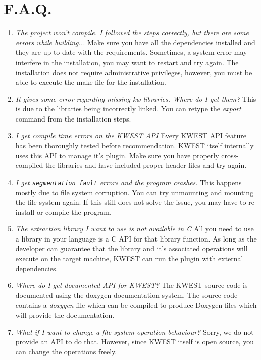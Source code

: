 \section{F.A.Q.}
\begin{enumerate} 
\item \emph{The project won't compile. I followed the steps correctly, but there are some errors while building...} \newline
Make sure you have all the dependencies installed and they are up-to-date with the requirements. Sometimes, a system error may interfere in the installation, you may want to restart and try again. The installation does not require administrative privileges, however, you must be able to execute the make file for the installation.
\item \emph{It gives some error regarding missing kw libraries. Where do I get them?} \newline
This is due to the libraries being incorrectly linked. You can retype the \textit{export} command from the installation steps.
\item \emph{I get compile time errors on the KWEST API} \newline
Every KWEST API feature has been thoroughly tested before recommendation. KWEST itself internally uses this API to manage it's plugin. Make sure you have properly cross-compiled the libraries and have included proper header files and try again.
\item \emph{I get \texttt{segmentation fault} errors and the program crashes.} \newline
This happens mostly due to file system corruption. You can try unmounting and mounting the file system again. If this still does not solve the issue, you may have to re-install or compile the program.
\item \emph{The extraction library I want to use is not available in C} \newline
All you need to use a library in your language is a C API for that library function. As long as the developer can guarantee that the library and it's associated operations will execute on the target machine, KWEST can run the plugin with external dependencies.
\item \emph{Where do I get documented API for KWEST?} \newline
The KWEST source code is documented using the doxygen documentation system. The source code contains a \textit{doxygen} file which can be compiled to produce Doxygen files which will provide the documentation.
\item \emph{What if I want to change a file system operation behaviour?} \newline
Sorry, we do not provide an API to do that. However, since KWEST itself is open source, you can change the operations freely.
\end{enumerate}